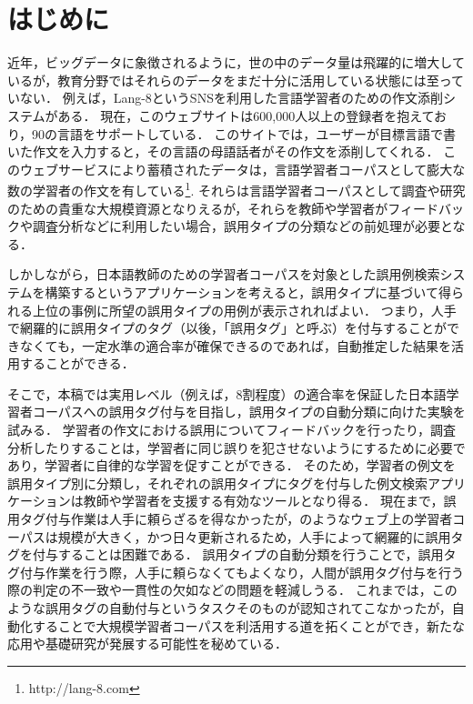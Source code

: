 \documentclass[japanese]{jnlp_1.4}
\newcommand{\lh}{}
\begin{document}
\maketitle


\section{はじめに}
近年，ビッグデータに象徴されるように，世の中のデータ量は飛躍的に増大しているが，教育分野ではそれらのデータをまだ十分に活用している状態には至っていない．
例えば，Lang-8というSNSを利用した言語学習者のための作文添削システムがある．
現在，このウェブサイトは600,000人以上の登録者を抱えており，90の言語をサポートしている．
このサイトでは，ユーザーが目標言語で書いた作文を入力すると，その言語の母語話者がその作文を添削してくれる．
このウェブサービスにより蓄積されたデータは，言語学習者コーパスとして膨大な数の学習者の作文を有している\footnote{http://lang-8.com}.
それらは言語学習者コーパスとして調査や研究のための貴重な大規模資源となりえるが，それらを教師や学習者がフィードバックや調査分析などに利用したい場合，誤用タイプの分類などの前処理が必要となる．

しかしながら，日本語教師のための学習者コーパスを対象とした誤用例検索システムを構築するというアプリケーションを考えると，誤用タイプに基づいて得られる上位の事例に所望の誤用タイプの用例が表示されればよい．
つまり，人手で網羅的に誤用タイプのタグ（以後，「誤用タグ」と呼ぶ）を付与することができなくても，一定水準の適合率が確保できるのであれば，自動推定した結果を活用することができる．

そこで，本稿では実用レベル（例えば，8割程度）の適合率を保証した日本語学習者コーパスへの誤用タグ付与を目指し，誤用タイプの自動分類に向けた実験を試みる．
学習者の作文における誤用についてフィードバックを行ったり，調査分析したりすることは，学習者に同じ誤りを犯させないようにするために必要であり，学習者に自律的な学習を促すことができる．
そのため，学習者の例文を誤用タイプ別に分類し，それぞれの誤用タイプにタグを付与した例文検索アプリケーションは教師や学習者を支援する有効なツールとなり得る．
現在まで，誤用タグ付与作業は人手に頼らざるを得なかったが，\lh\hbox{}のようなウェブ上の学習者コーパスは規模が大きく，かつ日々更新されるため，人手によって網羅的に誤用タグを付与することは困難である．
誤用タイプの自動分類を行うことで，誤用タグ付与作業を行う際，人手に頼らなくてもよくなり，人間が誤用タグ付与を行う際の判定の不一致や一貫性の欠如などの問題を軽減しうる．
これまでは，このような誤用タグの自動付与というタスクそのものが認知されてこなかったが，自動化することで大規模学習者コーパスを利活用する道を拓くことができ，新たな応用や基礎研究が発展する可能性を秘めている．
\end{document}
